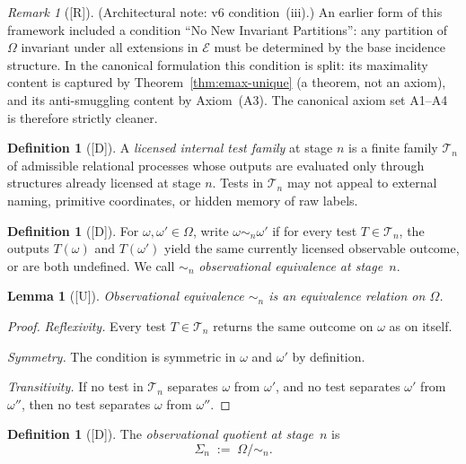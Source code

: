 \documentclass[12pt,oneside]{amsbook}
\theoremstyle{plain}
\newtheorem{lemma}[theorem]{Lemma}
\theoremstyle{definition}
\newtheorem{definition}[theorem]{Definition}
\theoremstyle{remark}
\newtheorem{remark}[theorem]{Remark}
\newcommand{\status}[1]{\textup{[#1]}}
\begin{document}
\begin{remark}[\status{R}]
\textup{(Architectural note: v6 condition~(iii).)}
An earlier form of this framework included a condition ``No New
Invariant Partitions'': any partition of $\Omega$ invariant under all
extensions in $\mathcal{E}$ must be determined by the base incidence
structure.  In the canonical formulation this condition is split:
its maximality content is captured by Theorem~\ref{thm:emax-unique}
(a theorem, not an axiom), and its anti-smuggling content by
Axiom~(A3).  The canonical axiom set A1--A4 is therefore strictly
cleaner.
\end{remark}

\begin{definition}[\status{D}]\label{def:test-family}
A \emph{licensed internal test family} at stage $n$ is a finite family
$\mathcal{T}_n$ of admissible relational processes whose outputs are
evaluated only through structures already licensed at stage $n$.
Tests in $\mathcal{T}_n$ may not appeal to external naming, primitive
coordinates, or hidden memory of raw labels.
\end{definition}

\begin{definition}[\status{D}]\label{def:obs-equiv}
For $\omega, \omega' \in \Omega$, write $\omega \sim_n \omega'$ if for
every test $T \in \mathcal{T}_n$, the outputs $T(\omega)$ and
$T(\omega')$ yield the same currently licensed observable outcome, or
are both undefined.  We call $\sim_n$ \emph{observational equivalence
at stage~$n$}.
\end{definition}

\begin{lemma}[\status{U}]\label{lem:obs-equiv-equiv}
Observational equivalence $\sim_n$ is an equivalence relation on
$\Omega$.
\end{lemma}

\begin{proof}
\textit{Reflexivity.}  Every test $T \in \mathcal{T}_n$ returns the
same outcome on $\omega$ as on itself.

\textit{Symmetry.}  The condition is symmetric in $\omega$ and
$\omega'$ by definition.

\textit{Transitivity.}  If no test in $\mathcal{T}_n$ separates
$\omega$ from $\omega'$, and no test separates $\omega'$ from
$\omega''$, then no test separates $\omega$ from $\omega''$.
\end{proof}

\begin{definition}[\status{D}]\label{def:obs-quotient}
The \emph{observational quotient at stage~$n$} is
\[
  \Sigma_n \;:=\; \Omega/{\sim_n}.
\]
\end{definition}
\end{document}
